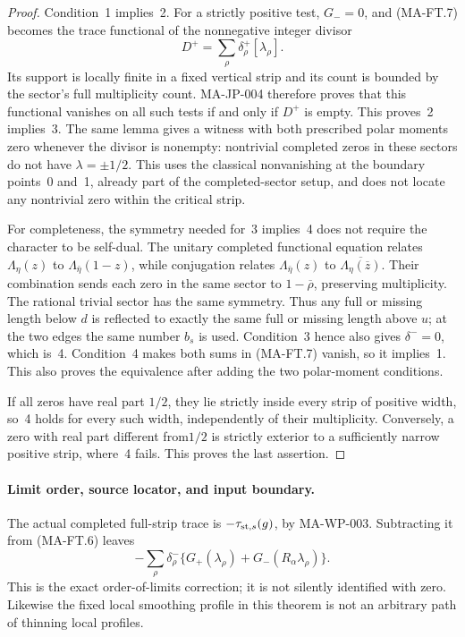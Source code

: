 \begin{proof}
Condition~1 implies~2.  For a strictly positive test,
$G_-=0$, and (MA-FT.7) becomes the trace functional of
the nonnegative integer divisor
\[
                   D^+=\sum_\rho\delta_\rho^+[\lambda_\rho].
 \tag{MA-FT.16}
\]
Its support is locally finite in a fixed vertical
strip and its count is bounded by the sector's full
multiplicity count.  MA-JP-004 therefore proves that
this functional vanishes on all such tests if and
only if $D^+$ is empty.  This proves~2 implies~3.
The same lemma gives a witness with both prescribed
polar moments zero whenever the divisor is nonempty:
nontrivial completed zeros in these sectors do not
have $\lambda=\pm1/2$.  This uses the classical
nonvanishing at the boundary points~0 and~1, already
part of the completed-sector setup, and does not
locate any nontrivial zero within the critical strip.

For completeness, the symmetry needed for~3 implies~4
does not require the character to be self-dual.
The unitary completed functional equation relates
$\Lambda_\eta(z)$ to $\Lambda_{\bar\eta}(1-z)$,
while conjugation relates
$\Lambda_{\bar\eta}(z)$ to
$\overline{\Lambda_\eta(\overline z)}$.
Their combination sends each zero in the same sector
to $1-\overline\rho$, preserving multiplicity.
The rational trivial sector has the same symmetry.
Thus any full or missing length below $d$ is reflected
to exactly the same full or missing length above $u$;
at the two edges the same number $b_s$ is used.
Condition~3 hence also gives $\delta^-=0$, which is~4.
Condition~4 makes both sums in (MA-FT.7) vanish, so it
implies~1.  This also proves the equivalence after
adding the two polar-moment conditions.

If all zeros have real part $1/2$, they lie strictly
inside every strip of positive width, so~4 holds for
every such width, independently of their multiplicity.
Conversely, a zero with real part different from$1/2$
is strictly exterior to a sufficiently narrow positive
strip, where~4 fails.  This proves the last assertion.
\end{proof}

\paragraph{Limit order, source locator, and input boundary.}
The actual completed full-strip trace is
$-\tau_{{\rm st},s}(g)$, by MA-WP-003.
Subtracting it from (MA-FT.6) leaves
\[
 -\sum_\rho\delta_\rho^-
       \{G_+(\lambda_\rho)+G_-(R_\alpha\lambda_\rho)\}.
 \tag{MA-FT.17}
\]
This is the exact order-of-limits correction; it is
not silently identified with zero.  Likewise the
fixed local smoothing profile in this theorem is
not an arbitrary path of thinning local profiles.

